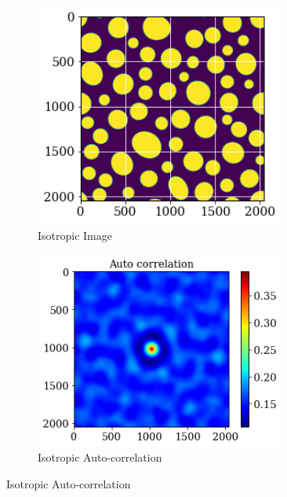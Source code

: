 \documentclass[12pt, a4paper]{report}
\begin{document}
\begin{figure}[H]
\centering
\begin{subfigure}{.45\textwidth}
  \centering
  \includegraphics[width=0.9\textwidth]{Pictures/Comparison/iso_img.png}
  \caption{Isotropic Image}
  \label{img:microstrImg}
\end{subfigure}
\begin{subfigure}{.5\textwidth}
  \centering
  \includegraphics[width=0.9\textwidth]{Pictures/Comparison/iso_heatmap.png}
  \caption{Isotropic Auto-correlation}
  \label{img:microstrImg}
\end{subfigure}


\end{figure}
\end{document}
